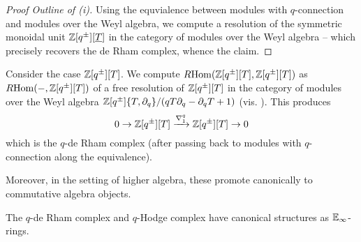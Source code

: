 \begin{proof}[Proof Outline of (i)]
    Using the equvialence between modules with $q$-connection and modules over the Weyl algebra, we compute a resolution of the symmetric monoidal unit $\mathbb{Z}[q^{\pm}][\underline{T}]$ in the category of modules over the Weyl algebra -- which precisely recovers the de Rham complex, whence the claim. 
\end{proof}
\begin{example}
    Consider the case $\mathbb{Z}[q^{\pm}][T]$. We compute $R\mathrm{Hom}(\mathbb{Z}[q^{\pm}][T],\mathbb{Z}[q^{\pm}][T])$ as $R\mathrm{Hom}(-,\mathbb{Z}[q^{\pm}][T])$ of a free resolution of $\mathbb{Z}[q^{\pm}][T]$ in the category of modules over the Weyl algebra $\mathbb{Z}[q^{\pm}]\{T,\partial_{q}\}/(qT\partial_{q}-\partial_{q}T+1)$ (vis. ). This produces 
    $$0\to\mathbb{Z}[q^{\pm}][T]\xrightarrow{\nabla_{1}^{q}}\mathbb{Z}[q^{\pm}][T]\to0$$
    which is the $q$-de Rham complex (after passing back to modules with $q$-connection along the equivalence). 
\end{example}
Moreover, in the setting of higher algebra, these promote canonically to commutative algebra objects. 
\begin{corollary}
    The $q$-de Rham complex and $q$-Hodge complex have canonical structures as $\mathbb{E}_{\infty}$-rings. 
\end{corollary}